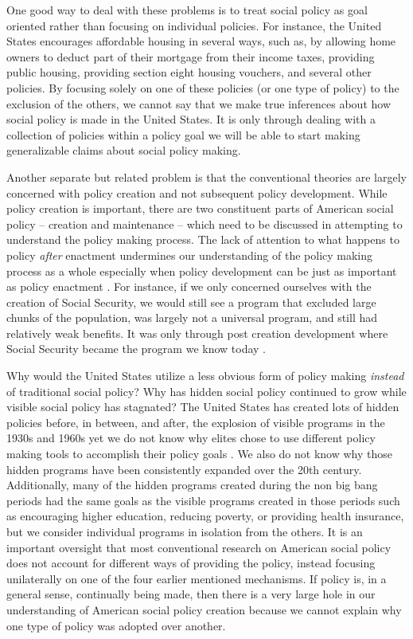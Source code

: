 \documentclass[12pt]{article}
\begin{document}
One good way to deal with these problems is to treat social policy as goal oriented rather than focusing on individual policies. For instance, the United States encourages affordable housing in several ways, such as, by allowing home owners to deduct part of their mortgage from their income taxes, providing public housing, providing section eight housing vouchers, and several other policies. By focusing solely on one of these policies (or one type of policy) to the exclusion of the others, we cannot say that we make true inferences about how social policy is made in the United States. It is only through dealing with a collection of policies within a policy goal we will be able to start making generalizable claims about social policy making.

Another separate but related problem is that the conventional theories are largely concerned with policy creation and not subsequent policy development. While policy creation is important, there are two constituent parts of American social policy -- creation and maintenance -- which need to be discussed in attempting to understand the policy making process. The lack of attention to what happens to policy \emph{after} enactment undermines our understanding of the policy making process as a whole especially when policy development can be just as important as policy enactment \citep{patashnik2008}. For instance, if we only concerned ourselves with the creation of Social Security, we would still see a program that excluded large chunks of the population, was largely not a universal program, and still had relatively weak benefits. It was only through post creation development where Social Security became the program we know today \citep{derthick1979}. 


Why would the United States utilize a less obvious form of policy making \emph{instead} of traditional social policy? Why has hidden social policy continued to grow while visible social policy has stagnated? The United States has created lots of hidden policies before, in between, and after, the explosion of visible programs in the 1930s and 1960s yet we do not know why elites chose to use different policy making tools to accomplish their policy goals \citep[Ch. 2]{howard2008}. We also do not know why those hidden programs have been consistently expanded over the 20th century. Additionally, many of the hidden programs created during the non big bang periods had the same goals as the visible programs created in those periods such as encouraging higher education, reducing poverty, or providing health insurance, but we consider individual programs in isolation from the others. It is an important oversight that most conventional research on American social policy does not account for different ways of providing the policy, instead focusing unilaterally on one of the four earlier mentioned mechanisms. If policy is, in a general sense, continually being made, then there is a very large hole in our understanding of American social policy creation because we cannot explain why one type of policy was adopted over another.
\end{document}
